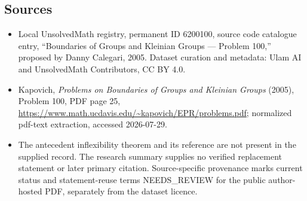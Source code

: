 \documentclass[11pt]{article}
\begin{document}
\subsection{Sources}
\begin{itemize}
\item Local UnsolvedMath registry, permanent ID 6200100, source code catalogue entry, ``Boundaries of Groups and Kleinian Groups --- Problem 100,'' proposed by Danny Calegari, 2005. Dataset curation and metadata: Ulam AI and UnsolvedMath Contributors, CC BY 4.0.
\item Kapovich, \emph{Problems on Boundaries of Groups and Kleinian Groups} (2005), Problem 100, PDF page 25, \url{https://www.math.ucdavis.edu/~kapovich/EPR/problems.pdf}; normalized pdf-text extraction, accessed 2026-07-29.
\item The antecedent inflexibility theorem and its reference are not present in the supplied record. The research summary supplies no verified replacement statement or later primary citation. Source-specific provenance marks current status and statement-reuse terms NEEDS\_REVIEW for the public author-hosted PDF, separately from the dataset licence.
\end{itemize}
\end{document}

